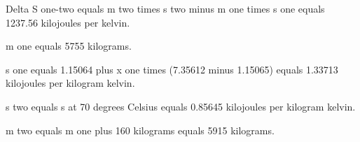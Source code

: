 Delta S one-two equals m two times s two minus m one times s one equals 1237.56 kilojoules per kelvin.  

m one equals 5755 kilograms.  

s one equals 1.15064 plus x one times (7.35612 minus 1.15065) equals 1.33713 kilojoules per kilogram kelvin.  

s two equals s at 70 degrees Celsius equals 0.85645 kilojoules per kilogram kelvin.  

m two equals m one plus 160 kilograms equals 5915 kilograms.
